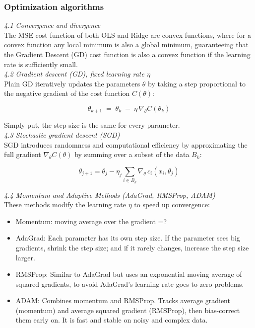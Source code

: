 \documentclass[amssymb,twocolumn,aps]{revtex4}
\begin{document}
\subsubsection{Optimization algorithms}

\textit{4.1 Convergence and divergence} \\

The MSE cost function of both OLS and Ridge are convex functions, where for a convex function any local minimum is also a global minimum, guaranteeing that the Gradient Descent (GD) cost function is also a convex function if the learning rate is sufficiently small. \\

\textit{4.2 Gradient descent (GD), fixed learning rate $\eta$} \\

Plain GD iteratively updates the parameters $\theta$ by taking a step proportional to the negative gradient of the cost function $C(\theta)$: 

\begin{equation}
\theta_{k+1} \;=\; \theta_k \;-\; \eta \,\nabla_{\theta} C(\theta_k)
\end{equation}

Simply put, the step size is the same for every parameter. \\ 

\textit{4.3 Stochastic gradient descent (SGD) } \\

SGD introduces randomness and computational efficiency by approximating the full gradient $\nabla_{\theta} C(\theta)$ by summing over a subset of the data $B_k$: 

\begin{equation}
    \theta_{j+1}
= \theta_j - \eta_j \sum_{i \in B_k} \nabla_{\theta}\, c_i(x_i,\theta_j)
\end{equation}

\textit{4.4 Momentum and Adaptive Methods (AdaGrad, RMSProp, ADAM) } \\

These methods modify the learning rate $\eta$ to speed up convergence: 

\begin{itemize}
    \item Momentum: moving average over the gradient =?
    \item AdaGrad: Each parameter has its own step size. If the parameter sees big gradients, shrink the step size; and if it rarely changes, increase the step size larger. 
    \item RMSProp: Similar to AdaGrad but uses an exponential moving average of squared gradients, to avoid AdaGrad's learning rate goes to zero problems. 
    \item ADAM: Combines momentum and RMSProp. Tracks average gradient (momentum) and average squared gradient (RMSProp), then bias-correct them early on. It is fast and stable on noisy and complex data. 
\end{itemize}
\end{document}
